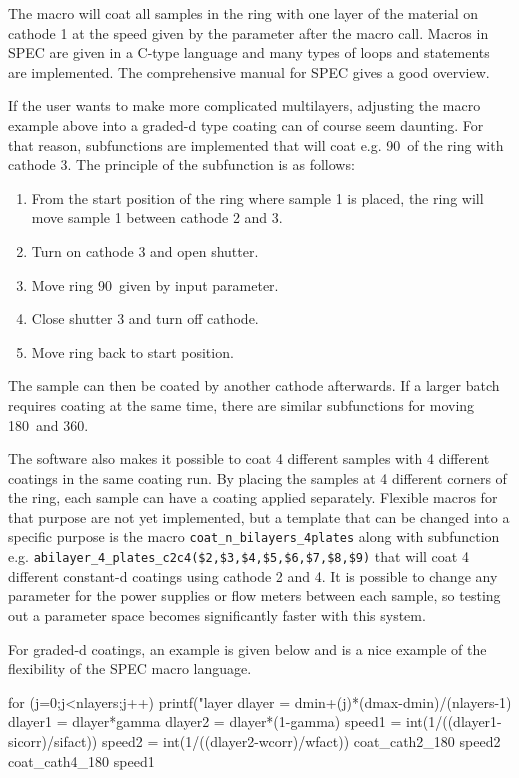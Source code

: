 The macro will coat all samples in the ring with one layer of the material on cathode 1 at the speed given by the parameter after the macro call. Macros in SPEC are given in a C-type language and many types of loops and statements are implemented. The comprehensive manual for SPEC gives a good overview.

If the user wants to make more complicated multilayers, adjusting the macro example above into a graded-d type coating can of course seem daunting. For that reason, subfunctions are implemented that will coat e.g. 90\degr\ of the ring with cathode 3. The principle of the subfunction is as follows:

\begin{enumerate}
  \item From the start position of the ring where sample 1 is placed, the ring will move sample 1 between cathode 2 and 3.
  \item Turn on cathode 3 and open shutter.
  \item Move ring 90\degr\ given by input parameter.
  \item Close shutter 3 and turn off cathode.
  \item Move ring back to start position.
\end{enumerate}

The sample can then be coated by another cathode afterwards. If a larger batch requires coating at the same time, there are similar subfunctions for moving 180\degr\ and 360\degr.

The software also makes it possible to coat 4 different samples with 4 different coatings in the same coating run. By placing the samples at 4 different corners of the ring, each sample can have a coating applied separately. Flexible macros for that purpose are not yet implemented, but a template that can be changed into a specific purpose is the macro \verb|coat_n_bilayers_4plates| along with subfunction e.g. \verb|abilayer_4_plates_c2c4($2,$3,$4,$5,$6,$7,$8,$9)| that will coat 4 different constant-d coatings using cathode 2 and 4. It is possible to change any parameter for the power supplies or flow meters between each sample, so testing out a parameter space becomes significantly faster with this system.

For graded-d coatings, an example is given below and is a nice example of the flexibility of the SPEC macro language.

\begin{verbcode}
  for (j=0;j<nlayers;j++){
    printf("\nStarting layer %
    dlayer = dmin+(j)*(dmax-dmin)/(nlayers-1)
    dlayer1 = dlayer*gamma
    dlayer2 = dlayer*(1-gamma)
    speed1 = int(1/((dlayer1-sicorr)/sifact))
    speed2 = int(1/((dlayer2-wcorr)/wfact))
    coat_cath2_180 speed2
    coat_cath4_180 speed1
    }
\end{verbcode}


